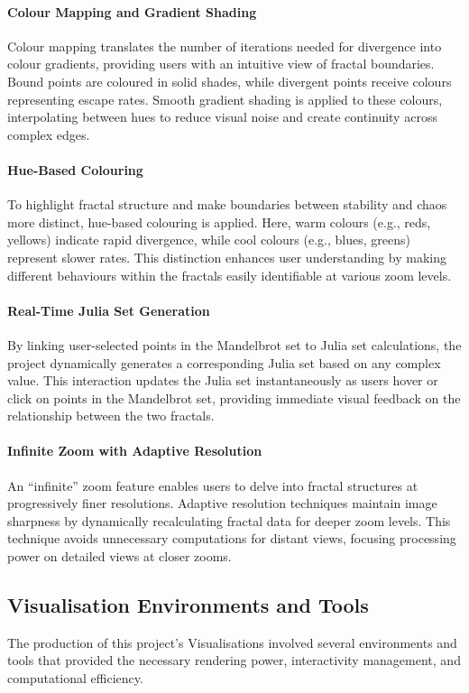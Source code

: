 \documentclass[12pt,a4paper]{report}
\begin{document}
\paragraph{Colour Mapping and Gradient Shading}
Colour mapping translates the number of iterations needed for divergence into colour gradients, providing users with an intuitive view of fractal boundaries. Bound points are coloured in solid shades, while divergent points receive colours representing escape rates. Smooth gradient shading is applied to these colours, interpolating between hues to reduce visual noise and create continuity across complex edges. 

\paragraph{Hue-Based Colouring} 
To highlight fractal structure and make boundaries between stability and chaos more distinct, hue-based colouring is applied. Here, warm colours (e.g., reds, yellows) indicate rapid divergence, while cool colours (e.g., blues, greens) represent slower rates. This distinction enhances user understanding by making different behaviours within the fractals easily identifiable at various zoom levels. 

\paragraph{Real-Time Julia Set Generation} 
By linking user-selected points in the Mandelbrot set to Julia set calculations, the project dynamically generates a corresponding Julia set based on any complex value. This interaction updates the Julia set instantaneously as users hover or click on points in the Mandelbrot set, providing immediate visual feedback on the relationship between the two fractals. 

\paragraph{Infinite Zoom with Adaptive Resolution}
An “infinite” zoom feature enables users to delve into fractal structures at progressively finer resolutions. Adaptive resolution techniques maintain image sharpness by dynamically recalculating fractal data for deeper zoom levels. This technique avoids unnecessary computations for distant views, focusing processing power on detailed views at closer zooms. 

\subsection{Visualisation Environments and Tools}
The production of this project’s Visualisations involved several environments and tools that provided the necessary rendering power, interactivity management, and computational efficiency. 
\end{document}
